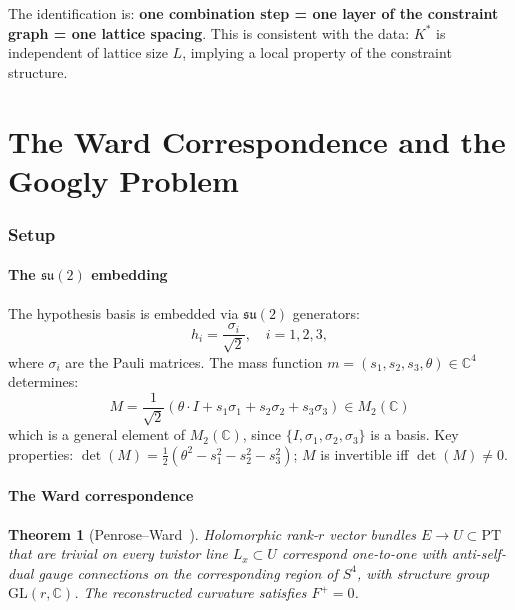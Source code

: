 \documentclass[11pt,a4paper]{article}
\newtheorem{theorem}{Theorem}[section]
\theoremstyle{definition}
\theoremstyle{remark}
\newcommand{\C}{\mathbb{C}}
\newcommand{\GL}{\mathrm{GL}}
\newcommand{\su}{\mathfrak{su}}
\newcommand{\PT}{\mathrm{PT}}
\begin{document}
The identification is: \textbf{one combination step = one layer of the constraint graph = one lattice spacing}. This is consistent with the data: $K^*$ is independent of lattice size $L$, implying a local property of the constraint structure.


\part{The Ward Correspondence and the Googly Problem}\label{part:C}

\section{Setup}\label{sec:wardsetup}

\subsection{The $\su(2)$ embedding}

The hypothesis basis is embedded via $\su(2)$ generators:
\begin{equation}\label{eq:hi}
h_i=\frac{\sigma_i}{\sqrt{2}},\quad i=1,2,3,
\end{equation}
where $\sigma_i$ are the Pauli matrices. The mass function $m=(s_1,s_2,s_3,\theta)\in\C^4$ determines:
\begin{equation}\label{eq:M}
M=\frac{1}{\sqrt{2}}(\theta\cdot I+s_1\sigma_1+s_2\sigma_2+s_3\sigma_3)\in M_2(\C)
\end{equation}
which is a general element of $M_2(\C)$, since $\{I,\sigma_1,\sigma_2,\sigma_3\}$ is a basis. Key properties: $\det(M)=\frac{1}{2}(\theta^2-s_1^2-s_2^2-s_3^2)$; $M$ is invertible iff $\det(M)\neq 0$.


\subsection{The Ward correspondence}

\begin{theorem}[Penrose--Ward~\cite{Ward1977,MasonWoodhouse}]\label{thm:ward}
Holomorphic rank-$r$ vector bundles $E\to U\subset\PT$ that are trivial on every twistor line $L_x\subset U$ correspond one-to-one with anti-self-dual gauge connections on the corresponding region of $S^4$, with structure group $\GL(r,\C)$. The reconstructed curvature satisfies $F^+=0$.
\end{theorem}
\end{document}

